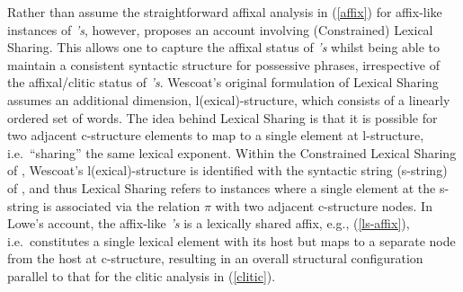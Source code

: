 \documentclass[output=paper,hidelinks]{langscibook}
\begin{document}
\begin{exe}
\ex 

\begin{xlist}


\exbox[-.85\baselineskip]{\label{affix} \begin{small}
Affix:\begin{forest}
[NP,
  [DP
  [NP [N, s sep=8mm, [Henry\textbf{'s},tier=word,edge={<-},edge label={node[midway,left,font=\footnotesize]{$\pi$}}]
  ]]]
  [N$'$ [N, s sep=8mm, [toys,tier=word,edge={<-},edge label={node[midway,left,font=\footnotesize]{$\pi$}}]
   ]]
   ]]
\end{forest}
\end{small}
}

\end{xlist}
\end{exe}

\largerpage[2]
Rather than assume the straightforward affixal analysis in (\ref{affix}) for affix-like instances of \textit{'s}, %
however, \citet{lowe2015clitic} proposes an account involving (Constrained) Lexical Sharing. This allows one  to capture the affixal status of \textit{'s} whilst being able to maintain a consistent syntactic structure for possessive phrases, irrespective of the affixal/clitic status of \textit{'s}. %
Wescoat's original formulation of Lexical Sharing \citep{wescoat2002,wescoat2005,wescoat2007,wescoat2009}  assumes an additional dimension, l(exical)-structure, which consists of a linearly ordered set of words. The idea behind Lexical Sharing is that it is possible for two adjacent c-structure elements to map to a single element at l-structure, i.e.~``sharing'' the same lexical exponent. Within the Constrained Lexical Sharing of \citet{Lowe15,lowe2015clitic}, Wescoat's l(exical)-structure is identified with the syntactic string (s-string) of \citet{kapl:89}, and thus Lexical Sharing refers to instances where a single element at the s-string is associated via the relation $\pi$ with two adjacent c-structure nodes. In Lowe's account, the affix-like \textit{'s} %
is a lexically shared affix, e.g., (\ref{ls-affix}),  i.e.~constitutes a single lexical element with its host but maps to a separate node from the host at c-structure, resulting in an overall structural configuration parallel to that for the clitic analysis in (\ref{clitic}).
\end{document}
